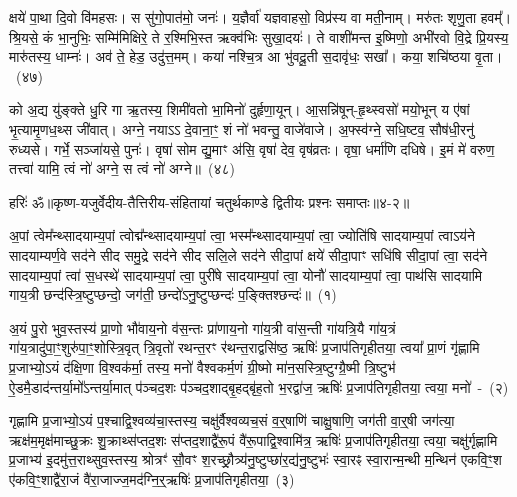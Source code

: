 क्षये॑ पा॒था दि॒वो वि॑महसः। स सु॑गो॒पात॑मो॒ जनः॑। य॒ज्ञैर्वा॑ यज्ञवाहसो॒ विप्र॑स्य वा मती॒नाम्। मरु॑तः शृणु॒ता हवम्᳚। श्रि॒यसे॒ कं भा॒नुभिः॒ सम्मि॑मिक्षिरे॒ ते र॒श्मिभि॒स्त ऋक्व॑भिः सुखा॒दयः॑। ते वाशी॑मन्त इ॒ष्मिणो॒ अभी॑रवो वि॒द्रे प्रि॒यस्य॒ मारु॑तस्य॒ धाम्नः॑। अव॑ ते॒ हेड॒ उदु॑त्त॒मम्। कया॑ नश्चि॒त्र आ भु॑वदू॒ती स॒दावृ॑धः॒ सखा᳚। कया॒ शचि॑ष्ठया वृ॒ता।~(४७)

को अ॒द्य यु॑ङ्क्ते धु॒रि गा ऋ॒तस्य॒ शिमी॑वतो भा॒मिनो॑ दुर्\mbox{}हृणा॒यून्। आ॒सन्नि॑षून्-हृ॒थ्स्वसो॑ मयो॒भून् य ए॑षां भृ॒त्यामृ॒णध॒थ्स जी॑वात्। अग्ने॒ नयाऽऽ दे॒वाना॒ꣳ॒ शं नो॑ भवन्तु॒ वाजे॑वाजे। अ॒फ्स्व॑ग्ने॒ सधि॒ष्टव॒ सौष॑धी॒रनु॑ रुध्यसे। गर्भे॒ सञ्जा॑यसे॒ पुनः॑। वृषा॑ सोम द्यु॒माꣳ अ॑सि॒ वृषा॑ देव॒ वृष॑व्रतः। वृषा॒ धर्मा॑णि दधिषे। इ॒मं मे॑ वरुण॒ तत्त्वा॑ यामि॒ त्वं नो॑ अग्ने॒ स त्वं नो॑ अग्ने॥~(४८)

{\anuvakamend[{हि वृ॒ता म॒ एका॑\-दश च}]}%

{हरिः॑ ॐ}{॥कृष्ण-यजुर्वेदीय-तैत्तिरीय-संहितायां चतुर्थकाण्डे द्वितीयः प्रश्नः समाप्तः॥४-२॥}

\setcounter{anuvakam}{0}
अ॒पां त्वेम᳚न्थ्सादयाम्य॒पां त्वोद्म᳚न्थ्सादयाम्य॒पां त्वा॒ भस्म᳚न्थ्सादयाम्य॒पां त्वा॒ ज्योति॑षि सादयाम्य॒पां त्वाऽय॑ने सादयाम्यर्ण॒वे सद॑ने सीद समु॒द्रे सद॑ने सीद सलि॒ले सद॑ने सीदा॒पां क्षये॑ सीदा॒पाꣳ सधि॑षि सीदा॒पां त्वा॒ सद॑ने सादयाम्य॒पां त्वा॑ स॒धस्थे॑ सादयाम्य॒पां त्वा॒ पुरी॑षे सादयाम्य॒पां त्वा॒ योनौ॑ सादयाम्य॒पां त्वा॒ पाथ॑सि सादयामि गाय॒त्री छन्द॑स्त्रि॒ष्टुप्छन्दो॒ जग॑ती॒ छन्दो॑\-ऽनु॒ष्टुप्छन्दः॑ प॒ङ्क्तिश्छन्दः॑॥~(१)

{\anuvakamend[{योनौ॒ पञ्च॑दश च}]}%

अ॒यं पु॒रो भुव॒स्तस्य॑ प्रा॒णो भौ॑वाय॒नो व॑स॒न्तः प्रा॑णाय॒नो गा॑य॒त्री वा॑स॒न्ती गा॑यत्रि॒यै गा॑य॒त्रं गा॑य॒त्रादु॑पा॒ꣳ॒शु\-रु॑पा॒ꣳ॒शोस्त्रि॒वृत् त्रि॒वृतो॑ रथन्त॒रꣳ र॑थन्त॒राद्वसि॑ष्ठ॒ ऋषिः॑ प्र॒जा\-प॑तिगृहीतया॒ त्वया᳚ प्रा॒णं गृ॑ह्णामि प्र॒जाभ्यो॒\-ऽयं द॑क्षि॒णा वि॒श्वक॑र्मा॒ तस्य॒ मनो॑ वैश्वकर्म॒णं ग्री॒ष्मो मा॑न॒सस्त्रि॒ष्टुग्ग्रै॒ष्मी त्रि॒ष्टुभ॑ ऐ॒डमै॒डाद॑न्तर्या॒मो᳚\-ऽन्तर्या॒मात् प॑ञ्चद॒शः प॑ञ्चद॒शाद्बृ॒हद्बृ॑ह॒तो भ॒रद्वा॑ज॒ ऋषिः॑ प्र॒जा\-प॑तिगृहीतया॒ त्वया॒ मनो॑~-~(२)

गृह्णामि प्र॒जाभ्यो॒\-ऽयं प॒श्चाद्वि॒श्वव्य॑चा॒स्तस्य॒ चक्षु॑र्वैश्वव्यच॒सं व॒र्॒\mbox{}षाणि॑ चाक्षु॒षाणि॒ जग॑ती वा॒र्॒\mbox{}षी जग॑त्या॒ ऋक्ष॑म॒मृक्ष॑माच्छु॒क्रः शु॒क्राथ्स॑प्तद॒शः स॑प्तद॒शाद्वै॑रू॒पं वै॑रू॒पाद्वि॒श्वामि॑त्र॒ ऋषिः॑ प्र॒जा\-प॑तिगृहीतया॒ त्वया॒ चक्षु॑र्गृह्णामि प्र॒जाभ्य॑ इ॒दमु॑त्त॒राथ्सुव॒स्तस्य॒ श्रोत्रꣳ॑ सौ॒वꣳ श॒रच्छ्रौ॒त्र्य॑नु॒ष्टुप्छा॑र॒द्य॑नु॒ष्टुभः॑ स्वा॒रꣴ स्वा॒रान्म॒न्थी म॒न्थिन॑ एकवि॒ꣳ॒श ए॑कवि॒ꣳ॒शाद्वै॑रा॒जं वै॑रा॒जाज्ज॒मद॑ग्नि॒र्॒\mbox{}ऋषिः॑ प्र॒जा\-प॑तिगृहीतया॒~(३)

